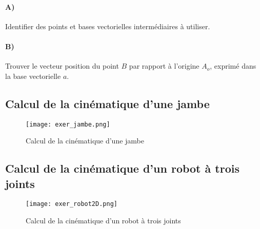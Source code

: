 \paragraph{A)}
Identifier des points et bases vectorielles intermédiaires à utiliser.

\paragraph{B)}
Trouver le vecteur position du point $B$ par rapport à l'origine $A_o$, exprimé dans la base vectorielle $a$.




\subsection{Calcul de la cinématique d'une jambe}

\begin{figure}[H]
	\centering
	\texttt{[image: exer\_jambe.png]}
	\caption{Calcul de la cinématique d'une jambe}
	\label{fig:exer_jambe}
\end{figure}


\subsection{Calcul de la cinématique d'un robot à trois joints}

\begin{figure}[H]
	\centering
	\texttt{[image: exer\_robot2D.png]}
	\caption{Calcul de la cinématique d'un robot à trois joints}
	\label{fig:exer_exer_robot2D}
\end{figure}

